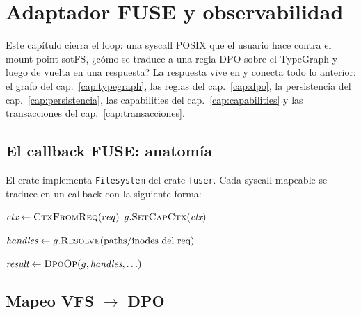 \chapter{Adaptador FUSE y observabilidad}
\label{cap:fuse}

Este capítulo cierra el loop: una syscall POSIX que el usuario hace
contra el mount point sotFS, ¿cómo se traduce a una regla DPO sobre el
TypeGraph y luego de vuelta en una respuesta? La respuesta vive en
 y conecta todo lo anterior: el grafo del
cap.~\ref{cap:typegraph}, las reglas del cap.~\ref{cap:dpo}, la
persistencia del cap.~\ref{cap:persistencia}, las capabilities del
cap.~\ref{cap:capabilities} y las transacciones del
cap.~\ref{cap:transacciones}.

\section{El callback FUSE: anatomía}

El crate  implementa \texttt{Filesystem} del
crate \texttt{fuser}. Cada syscall mapeable se traduce en un callback
con la siguiente forma:

\begin{algorithm}[H]
\SetAlgoLined
{}
\caption{\textsc{Skeleton de un callback FUSE en sotFS}}\label{alg:fuse-cb}


$\textit{ctx} \gets \textsc{CtxFromReq}(req)$\;
$g.\textsc{SetCapCtx}(\textit{ctx})$\;


$\textit{handles} \gets g.\textsc{Resolve}(\text{paths/inodes del req})$\;


$\textit{result} \gets \textsc{DpoOp}(g, \textit{handles}, \ldots)$\;




\end{algorithm}

\section{Mapeo VFS $\to$ DPO}

